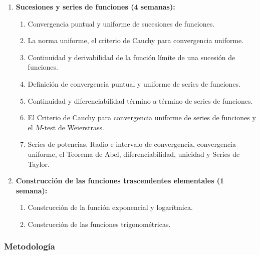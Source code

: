 \begin{refsection}
\begin{enumerate}
\item \textbf{Sucesiones y series de funciones (4 semanas):} 
\begin{enumerate}
    \item Convergencia puntual y uniforme de sucesiones de funciones.
    \item La norma uniforme, el criterio de Cauchy para convergencia uniforme.
    \item Continuidad y derivabilidad de la función límite de una sucesión de funciones.
    \item Definición de convergencia puntual y uniforme de series de funciones.
    \item Continuidad y diferenciabilidad término a término de series de funciones.
    \item El Criterio de Cauchy para convergencia uniforme de series de funciones y el $M$-test de Weierstrass.
    \item Series de potencias. Radio e intervalo de convergencia, convergencia uniforme, el Teorema de Abel, diferenciabilidad, unicidad y Series de Taylor.
\end{enumerate}

\item \textbf{Construcción de las funciones trascendentes elementales (1 semana):} 
\begin{enumerate}
    \item Construcción de la función exponencial y logarítmica.
    \item Construcción de las funciones trigonométricas.
\end{enumerate}

\end{enumerate}

\subsubsection*{Metodología}


\end{refsection}
